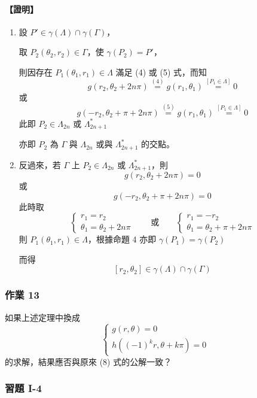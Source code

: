 \paragraph{【證明】}
\begin{enumerate}[label=(\roman*), leftmargin=3.5em]
\item 設 $P' \in \gamma(\Lambda) \cap \gamma(\Gamma)$，

取 $P_2(\theta_2, r_2) \in \Gamma$，使 $\gamma(P_2) = P'$，

則因存在 $P_1(\theta_1, r_1) \in \Lambda$ 滿足 (4) 或 (5) 式，而知
\[
g(r_2, \theta_2 + 2n\pi) \stackrel{(4)}{=} g(r_1, \theta_1) \stackrel{[P_1 \in \Lambda]}{=} 0
\]
或
\[
g(-r_2, \theta_2 + \pi + 2n\pi) \stackrel{(5)}{=} g(r_1, \theta_1) \stackrel{[P_1 \in \Lambda]}{=} 0
\]
此即 $P_2 \in \Lambda_{2n}$ 或 $\Lambda^*_{2n+1}$

亦即 $P_2$ 為 $\Gamma$ 與 $\Lambda_{2n}$ 或與 $\Lambda^*_{2n+1}$ 的交點。

\item 反過來，若 $\Gamma$ 上 $P_2 \in \Lambda_{2n}$ 或 $\Lambda^*_{2n+1}$，則
\[
g(r_2, \theta_2 + 2n\pi) = 0
\]
或
\[
g(-r_2, \theta_2 + \pi + 2n\pi) = 0
\]
此時取
\[
\begin{cases}
r_1 = r_2 \\[4pt]
\theta_1 = \theta_2 + 2n\pi
\end{cases}
\qquad \text{或} \qquad
\begin{cases}
r_1 = -r_2 \\[4pt]
\theta_1 = \theta_2 + \pi + 2n\pi
\end{cases}
\]
則 $P_1(\theta_1, r_1) \in \Lambda$，根據命題 4 亦即 $\gamma(P_1) = \gamma(P_2)$

而得
\[
[r_2, \theta_2] \in \gamma(\Lambda) \cap \gamma(\Gamma) \tag*{$\#$}
\]
\end{enumerate}

\medskip
\subsubsection*{作業 13}
如果上述定理中換成
\[
\begin{cases}
g(r, \theta) = 0 \\[4pt]
h((-1)^k r, \theta + k\pi) = 0
\end{cases}
\]
的求解，結果應否與原來 (8) 式的公解一致？

\subsubsection*{習題 I-4}\label{sec:b5-ex1-4}

